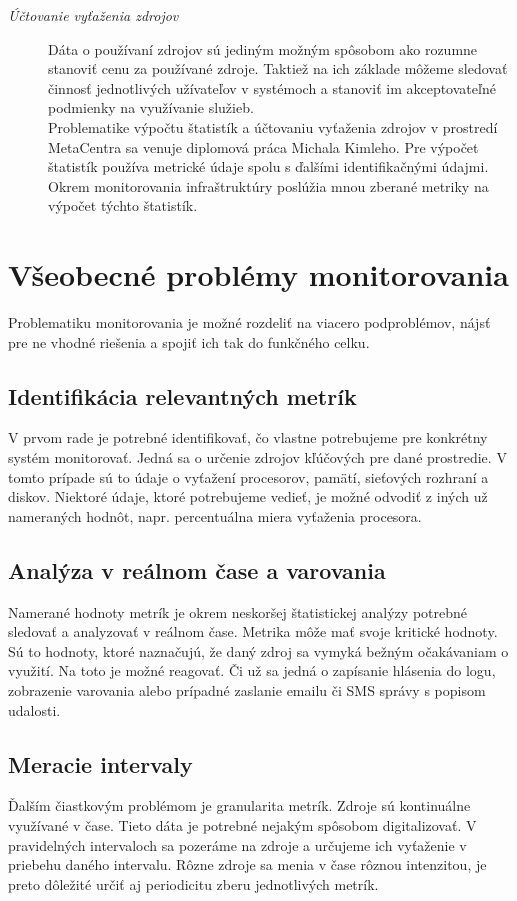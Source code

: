 \documentclass[printed,11pt,twoside,color,cover,table]{fithesis3}
\begin{document}
\begin{description}
\item[\emph{Účtovanie vyťaženia zdrojov}]
Dáta o používaní zdrojov sú jediným možným spôsobom ako rozumne stanoviť cenu za používané zdroje.
Taktiež na ich základe môžeme sledovať činnosť jednotlivých užívateľov v systémoch a stanoviť im akceptovateľné podmienky na využívanie služieb.
\\Problematike výpočtu štatistík a účtovaniu vyťaženia zdrojov v prostredí MetaCentra sa venuje diplomová práca Michala Kimleho\cite{uctovanie}.
Pre výpočet štatistík používa metrické údaje spolu s ďalšími identifikačnými údajmi. Okrem monitorovania infraštruktúry poslúžia
mnou zberané metriky na výpočet týchto štatistík.
\end{description}

\section{Všeobecné problémy monitorovania}
Problematiku monitorovania je možné rozdeliť na viacero podproblémov, nájsť pre ne vhodné riešenia a spojiť ich tak do funkčného celku. 

\subsection{Identifikácia relevantných metrík}
V prvom rade je potrebné identifikovať, čo vlastne potrebujeme pre konkrétny systém monitorovať. Jedná sa o určenie zdrojov kľúčových pre dané prostredie. V tomto prípade sú to údaje o vyťažení
procesorov, pamätí, sieťových rozhraní a diskov. Niektoré údaje, ktoré potrebujeme vedieť, je možné odvodiť z iných už nameraných hodnôt, napr. percentuálna miera vyťaženia procesora. 

\subsection{Analýza v reálnom čase a varovania}
Namerané hodnoty metrík je okrem neskoršej štatistickej analýzy potrebné sledovať a analyzovať v reálnom čase. Metrika môže mať svoje kritické hodnoty. Sú to hodnoty, ktoré naznačujú, že daný zdroj sa 
vymyká bežným očakávaniam o využití. Na toto je možné reagovať. Či už sa jedná o zapísanie hlásenia do logu, zobrazenie varovania alebo prípadné zaslanie emailu či SMS správy s popisom udalosti.

\subsection{Meracie intervaly}
Ďalším čiastkovým problémom je granularita metrík. Zdroje sú kontinuálne využívané v čase. Tieto dáta je potrebné nejakým spôsobom digitalizovať. V pravidelných intervaloch sa pozeráme na zdroje
a určujeme ich vyťaženie v priebehu daného intervalu. Rôzne zdroje sa menia v čase rôznou intenzitou, je preto dôležité určiť aj periodicitu zberu jednotlivých metrík.
\end{document}
